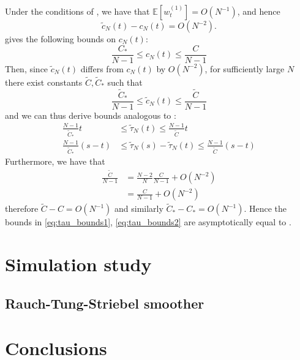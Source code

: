 \documentclass{article}
\newcommand{\E}{\mathbb{E}}
\newcommand{\wt}[2][t]{w_{#1}^{(#2)}}
\begin{document}
Under the conditions of \citet[Corollary 2]{koskela2018}, we have that $\E[\wt{1}] = O(N^{-1})$, and hence
\begin{equation*}
\tilde{c}_N(t) - c_N(t) = O(N^{-2}).
\end{equation*}
\citet{koskela2018} gives the following bounds on $c_N(t)$:
\begin{equation*}
\frac{C_*}{N-1} \leq c_N(t) \leq \frac{C}{N-1}
\end{equation*}
Then, since $\tilde{c}_N(t)$ differs from $c_N(t)$ by $O(N^{-2})$, for sufficiently large $N$ there exist constants $\tilde{C}, \tilde{C}_*$ such that
\begin{equation*}
\frac{\tilde{C}_*}{N-1} \leq \tilde{c}_N(t) \leq \frac{\tilde{C}}{N-1}
\end{equation*}
and we can thus derive bounds analogous to \citet[(5)-(6)]{koskela2018}:
\begin{align}
\frac{N-1}{\tilde{C}_*}t &\leq \tilde{\tau}_N(t) \leq \frac{N-1}{\tilde{C}}t \label{eq:tau_bounds1}\\
\frac{N-1}{\tilde{C}_*}(s-t) &\leq \tilde{\tau}_N(s) - \tilde{\tau}_N(t) \leq \frac{N-1}{\tilde{C}}(s-t) \label{eq:tau_bounds2}
\end{align}
Furthermore, we have that
\begin{align*}
\frac{\tilde{C}}{N-1} &= \frac{N-2}{N} \frac{C}{N-1} + O(N^{-2}) \\
&= \frac{C}{N-1} + O(N^{-2})
\end{align*}
therefore $\tilde{C} - C = O(N^{-1})$ and similarly $\tilde{C}_* - C_* = O(N^{-1})$. Hence the bounds in \eqref{eq:tau_bounds1}, \eqref{eq:tau_bounds2} are asymptotically equal to \citet[(5)-(6)]{koskela2018}.
\section{Simulation study}

\subsection{Rauch-Tung-Striebel smoother}

\section{Conclusions}


\end{document}
